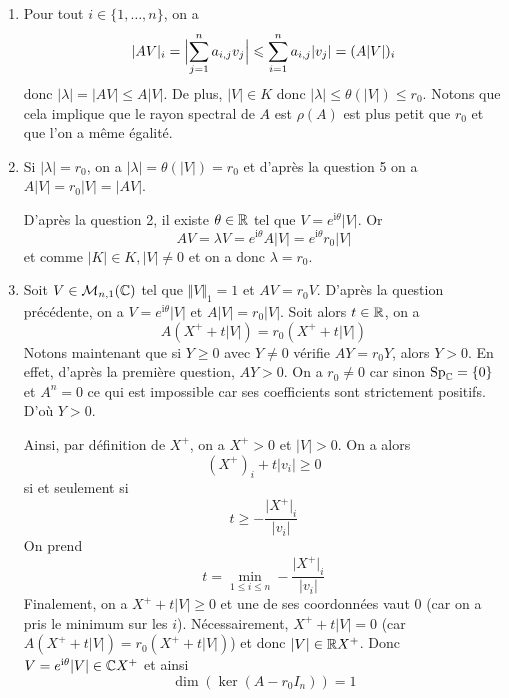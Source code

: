 \begin{solution}
\begin{enumerate}
		\item Pour tout $i\in\{1,\dots,n\}$, on a 
		$$\vert AV\vert_{i}=\Bigl\lvert\sum_{j=1}^{n}a_{i,j}v_{j}\Bigr\rvert\leqslant\sum_{i=1}^{n}a_{i,j}\vert v_{j}\vert=(A\vert V\vert)_{i}$$
		donc $\vert\lambda\vert=\vert AV\vert\leqslant A\vert V\vert$. De plus, $\vert V\vert\in K$ donc $\vert\lambda\vert\leqslant\theta(\vert V\vert)\leqslant r_{0}$. Notons que cela implique que le rayon spectral de $A$ est $\rho(A)$ est plus petit que $r_{0}$ et que l'on a même égalité.

		\item Si $\vert\lambda\vert=r_{0}$, on a $\vert\lambda\vert=\theta(\vert V\vert)=r_{0}$ et d'après la question 5 on a $A\vert V\vert=r_{0}\vert V\vert=\vert AV\vert$.
		
		D'après la question 2, il existe $\theta\in\mathbb{R}$ tel que $V=e^{\mathrm{i}\theta}\vert V\vert$. Or 
		$$AV=\lambda V=e^{\mathrm{i}\theta}A\vert V\vert=e^{\mathrm{i}\theta}r_{0}\vert V\vert$$
		et comme $\vert K\vert\in K, \vert V\vert\neq0$ et on a donc $\lambda=r_{0}$.

		\item Soit $V\in\mathcal{M}_{n,1}(\mathbb{C})$ tel que $\Vert V\Vert_{1}=1$ et $AV=r_{0}V$. D'après la question précédente, on a $V=e^{\mathrm{i}\theta}\vert V\vert$ et $A\vert V\vert=r_{0}\vert V\vert$. Soit alors $t\in\mathbb{R}$, on a 
		$$A(X^{+}+t\vert V\vert)=r_{0}(X^{+}+t\vert V\vert)$$
		Notons maintenant que si $Y\geqslant0$ avec $Y\neq0$ vérifie $AY=r_{0}Y$, alors $Y>0$. En effet, d'après la première question, $AY>0$. On a $r_{0}\neq0$ car sinon $\operatorname{Sp}_{\mathbb{C}}=\{0\}$ et $A^{n}=0$ ce qui est impossible car ses coefficients sont strictement positifs. D'où $Y>0$.

		Ainsi, par définition de $X^{+}$, on a $X^{+}>0$ et $\vert V\vert>0$. On a alors 
		$$(X^{+})_{i}+t\vert v_{i}\vert\geqslant0$$
		si et seulement si
		$$t\geqslant -\frac{\vert X^{+}\vert_{i}}{\vert v_{i}\vert}$$
		On prend 
		$$t=\min\limits_{1\leqslant i\leqslant n}-\frac{\vert X^{+}\vert_{i}}{\vert v_{i}\vert}$$
		Finalement, on a $X^{+}+t\vert V\vert\geqslant0$ et une de ses coordonnées vaut 0 (car on a pris le minimum sur les $i$). Nécessairement, $X^{+}+t\vert V\vert=0$ (car $A(X^{+}+t\vert V\vert)=r_{0}(X^{+}+t\vert V\vert)$) et donc $\vert V\vert\in\mathbb{R} X^{+}$. Donc $V=e^{\mathrm{i}\theta}\vert V\vert\in\mathbb{C} X^{+}$ et ainsi 
		$$\dim(\ker(A-r_{0}I_{n}))=1$$
	\end{enumerate}
\end{solution}

